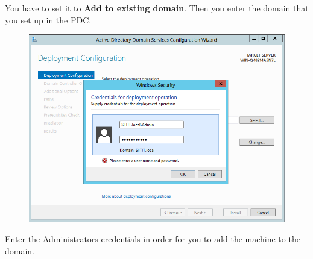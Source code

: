 \documentclass{article}
\begin{document}
You have to set it to \textbf{Add to existing domain}. Then you enter the domain that you set up in the PDC. 
\begin{figure}[h]
	\centering
	\includegraphics[width=.5\linewidth, height=.25\textheight]{BDC/2}
\end{figure}
Enter the Administrators credentials in order for you to add the machine to the domain.
\end{document}
